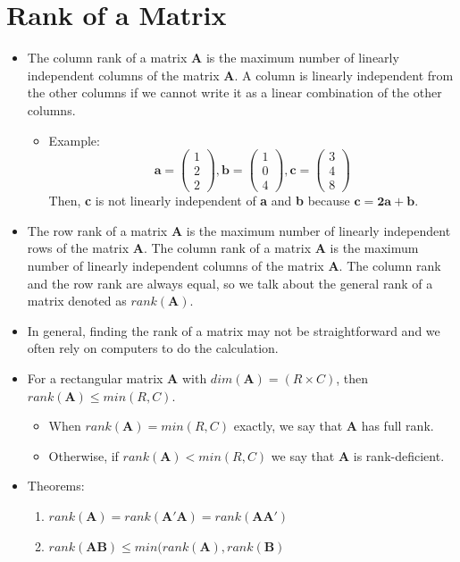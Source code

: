 \documentclass[11pt]{article}
\theoremstyle{definition}
\theoremstyle{remark}
\begin{document}
\section{Rank of a Matrix}
\begin{itemize}
\item The column rank of a matrix \textbf{A} is the maximum number of linearly independent columns of the matrix \textbf{A}. A column is linearly independent from the other columns if we cannot write it as a linear combination of the other columns.
\begin{itemize}

\item Example: 
$$
\mathbf{a} =
\begin{pmatrix} 
1 \\ 2 \\ 2
\end{pmatrix}
,  
\mathbf{b} =
\begin{pmatrix} 
1 \\ 0 \\ 4
\end{pmatrix}
, 
\mathbf{c} =
\begin{pmatrix} 
3 \\ 4 \\ 8
\end{pmatrix}
$$
Then, \textbf{c} is not linearly independent of \textbf{a} and \textbf{b} because $\mathbf{c = 2a + b}$.
\end{itemize}

\item The row rank of a matrix \textbf{A} is the maximum number of linearly independent rows of the matrix \textbf{A}. The column rank of a matrix \textbf{A} is the maximum number of linearly independent columns of the matrix \textbf{A}. The column rank and the row rank are always equal, so we talk about the general rank of a matrix denoted as $rank(\mathbf{A})$.
\item In general, finding the rank of a matrix may not be straightforward and we often rely on computers to do the calculation.
\item For a rectangular matrix \textbf{A} with $dim(\mathbf{A}) = (R \times C)$, then $rank(\mathbf{A}) \leq min(R, C)$. 
\begin{itemize}
\item When $rank(\mathbf{A}) = min(R, C)$ exactly, we say that \textbf{A} has full rank. 
\item Otherwise, if $rank(\mathbf{A}) < min(R, C)$ we say that \textbf{A} is rank-deficient.
\end{itemize}
\item Theorems: 
\begin{enumerate}
\item $rank(\mathbf{A}) = rank(\mathbf{A'A})=rank(\mathbf{AA'})$
\item $rank(\mathbf{AB}) \leq min(rank(\mathbf{A}), rank(\mathbf{B})$
\end{enumerate}

\end{itemize}
\end{document}
